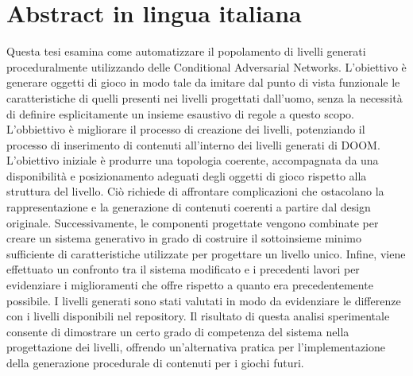 \documentclass{Configuration_Files/PoliMi3i_thesis}
\begin{document}
\chapter*{Abstract in lingua italiana}
Questa tesi esamina come automatizzare il popolamento di livelli generati proceduralmente utilizzando delle Conditional Adversarial Networks. L'obiettivo è generare oggetti di gioco in modo tale da imitare dal punto di vista funzionale  le caratteristiche di quelli presenti nei livelli progettati dall'uomo, senza la necessità di definire esplicitamente un insieme esaustivo di regole a questo scopo. L'obbiettivo è migliorare il processo di creazione dei livelli, potenziando il processo di inserimento di contenuti all'interno dei livelli generati di DOOM. L'obiettivo iniziale è produrre una topologia coerente, accompagnata da una disponibilità e posizionamento adeguati degli oggetti di gioco rispetto alla struttura del livello. Ciò richiede di affrontare complicazioni che ostacolano la rappresentazione e la generazione di contenuti coerenti a partire dal design originale. Successivamente, le componenti progettate vengono combinate per creare un sistema generativo in grado di costruire il sottoinsieme minimo sufficiente di caratteristiche utilizzate per progettare un livello unico. Infine, viene effettuato un confronto tra il sistema modificato e i precedenti lavori per evidenziare i miglioramenti che offre rispetto a quanto era precedentemente possibile. I livelli generati sono stati valutati in modo da evidenziare le differenze con i livelli disponibili nel repository. Il risultato di questa analisi sperimentale consente di dimostrare un certo grado di competenza del sistema nella progettazione dei livelli, offrendo un'alternativa pratica per l'implementazione della generazione procedurale di contenuti per i giochi futuri.
\\
\\



\thispagestyle{empty}
\tableofcontents %
\thispagestyle{empty}
\cleardoublepage

%
%
%    
%
\end{document}
